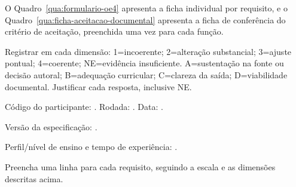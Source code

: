 \begin{apendicesenv}
O Quadro~\ref{qua:formulario-oe4} apresenta a ficha individual por requisito, e o Quadro~\ref{qua:ficha-aceitacao-documental} apresenta a ficha de conferência do critério de aceitação, preenchida uma vez para cada função.

Registrar em cada dimensão: 1=incoerente; 2=alteração substancial; 3=ajuste pontual; 4=coerente; NE=evidência insuficiente. A=sustentação na fonte ou decisão autoral; B=adequação curricular; C=clareza da saída; D=viabilidade documental. Justificar cada resposta, inclusive NE.

\clearpage

Código do participante: \underline{\hspace{2cm}}. Rodada: \underline{\hspace{1cm}}. Data: \underline{\hspace{2cm}}.

Versão da especificação: \underline{\hspace{3cm}}.

Perfil/nível de ensino e tempo de experiência: \underline{\hspace{6cm}}.

Preencha uma linha para cada requisito, seguindo a escala e as dimensões descritas acima.

\begingroup
{}


\end{apendicesenv}
